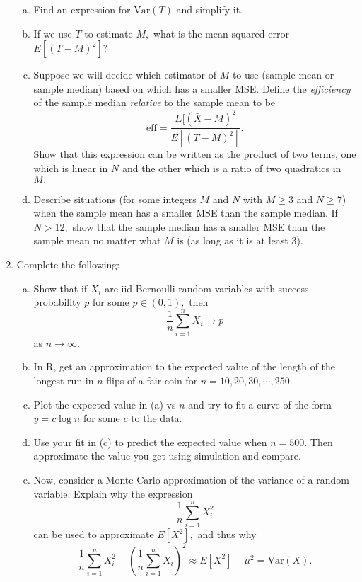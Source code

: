 \documentclass{article}
\newcommand{\var}{\mathrm{Var}}
\begin{document}
\begin{enumerate}
\begin{enumerate}[(a)]
			\item Find an expression for $\var(T)$ and simplify it.

			\item If we use $T$ to estimate $M,$ what is the mean squared error $E[(T-M)^2]?$

			\item Suppose we will decide which estimator of $M$ to use (sample mean or sample median) based on which has a smaller MSE. Define the \textit{efficiency} of the sample median \textit{relative} to the sample mean to be \[\text{eff}=\frac{E[(\bar{X}-M)^2}{E[(T-M)^2]}.\] Show that this expression can be written as the product of two terms, one which is linear in $N$ and the other which is a ratio of two quadratics in $M.$

			\item Describe situations (for some integers $M$ and $N$ with $M\ge3$ and $N\ge7$) when the sample mean has a smaller MSE than the sample median. If $N>12,$ show that the sample median has a smaller MSE than the sample mean no matter what $M$ is (as long as it is at least 3).

		\end{enumerate}

	\item Complete the following:
		\begin{enumerate}[(a)]
			\item Show that if $X_i$ are iid Bernoulli random variables with success probability $p$ for some $p\in(0, 1),$ then \[\frac{1}{n}\sum_{i=1}^n X_i\to p\] as $n\to\infty.$

			\item In R, get an approximation to the expected value of the length of the longest run in $n$ flips of a fair coin for $n=10, 20, 30, \cdots, 250.$

			\item Plot the expected value in (a) vs $n$ and try to fit a curve of the form $y=c\log n$ for some $c$ to the data.

			\item Use your fit in (c) to predict the expected value when $n=500.$ Then approximate the value you get using simulation and compare.
				
			\item Now, consider a Monte-Carlo approximation of the variance of a random variable. Explain why the expression \[\frac{1}{n}\sum_{i=1}^n X_i^2\] can be used to approximate $E[X^2],$ and thus why \[\frac{1}{n}\sum_{i=1}^n X_i^2 - \left( \frac{1}{n}\sum_{i=1}^n X_i \right)^2 \approx E[X^2]-\mu^2=\var(X).\]


\end{enumerate}
\end{enumerate}
\end{document}
